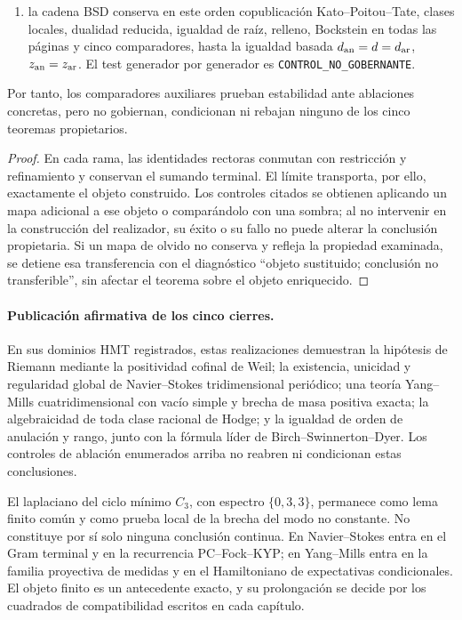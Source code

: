 \begin{proposition}
\begin{enumerate}
 \texttt{CONTROL\_NO\_GOBERNANTE};
 \item la cadena BSD conserva en este orden copublicación Kato--Poitou--Tate,
 clases locales, dualidad reducida, igualdad de raíz, relleno, Bockstein en
 todas las páginas y cinco comparadores, hasta la igualdad basada
 \(d_{\rm an}=d=d_{\rm ar}\), \(z_{\rm an}=z_{\rm ar}\). El test generador
 por generador es \texttt{CONTROL\_NO\_GOBERNANTE}.
\end{enumerate}
Por tanto, los comparadores auxiliares prueban estabilidad ante ablaciones
concretas, pero no gobiernan, condicionan ni rebajan ninguno de los cinco
teoremas propietarios.
\end{proposition}

\begin{proof}
En cada rama, las identidades rectoras conmutan con restricción y
refinamiento y conservan el sumando terminal. El límite transporta, por
ello, exactamente el objeto construido. Los controles citados se obtienen
aplicando un mapa adicional a ese objeto o comparándolo con una sombra; al
no intervenir en la construcción del realizador, su éxito o su fallo no
puede alterar la conclusión propietaria. Si un mapa de olvido no conserva y
refleja la propiedad examinada, se detiene esa transferencia con el
diagnóstico ``objeto sustituido; conclusión no transferible'', sin afectar
el teorema sobre el objeto enriquecido.
\end{proof}

\paragraph{Publicación afirmativa de los cinco cierres.}
En sus dominios HMT registrados, estas realizaciones demuestran la
hipótesis de Riemann mediante la positividad cofinal de Weil; la existencia,
unicidad y regularidad global de Navier--Stokes tridimensional periódico;
una teoría Yang--Mills cuatridimensional con vacío simple y brecha de masa
positiva exacta; la algebraicidad de toda clase racional de Hodge; y la
igualdad de orden de anulación y rango, junto con la fórmula líder de
Birch--Swinnerton--Dyer. Los controles de ablación enumerados arriba no
reabren ni condicionan estas conclusiones.

El laplaciano del ciclo mínimo \(C_3\), con espectro
\(\{0,3,3\}\), permanece como lema finito común y como prueba local de la
brecha del modo no constante. No constituye por sí solo ninguna conclusión
continua. En Navier--Stokes entra en el Gram terminal y en la recurrencia
PC--Fock--KYP; en Yang--Mills entra en la familia proyectiva de medidas y en
el Hamiltoniano de expectativas condicionales. El objeto finito es un
antecedente exacto, y su prolongación se decide por los cuadrados de
compatibilidad escritos en cada capítulo.

